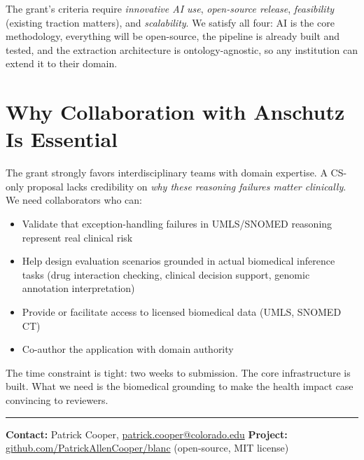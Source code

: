 \documentclass[11pt]{article}
\begin{document}
The grant's criteria require \emph{innovative AI use}, \emph{open-source release}, \emph{feasibility} (existing traction matters), and \emph{scalability}. We satisfy all four: AI is the core methodology, everything will be open-source, the pipeline is already built and tested, and the extraction architecture is ontology-agnostic, so any institution can extend it to their domain.

\section*{Why Collaboration with Anschutz Is Essential}

The grant strongly favors interdisciplinary teams with domain expertise. A CS-only proposal lacks credibility on \emph{why these reasoning failures matter clinically}. We need collaborators who can:

\begin{itemize}[nosep, leftmargin=1.5em]
    \item Validate that exception-handling failures in UMLS/SNOMED reasoning represent real clinical risk
    \item Help design evaluation scenarios grounded in actual biomedical inference tasks (drug interaction checking, clinical decision support, genomic annotation interpretation)
    \item Provide or facilitate access to licensed biomedical data (UMLS, SNOMED CT)
    \item Co-author the application with domain authority
\end{itemize}

The time constraint is tight: two weeks to submission. The core infrastructure is built. What we need is the biomedical grounding to make the health impact case convincing to reviewers.

\vspace{4pt}
\hrule
\vspace{4pt}
{\small\textbf{Contact:} Patrick Cooper, \href{mailto:patrick.cooper@colorado.edu}{patrick.cooper@colorado.edu} \hfill \textbf{Project:} \href{https://github.com/PatrickAllenCooper/blanc}{github.com/PatrickAllenCooper/blanc} (open-source, MIT license)}
\end{document}
